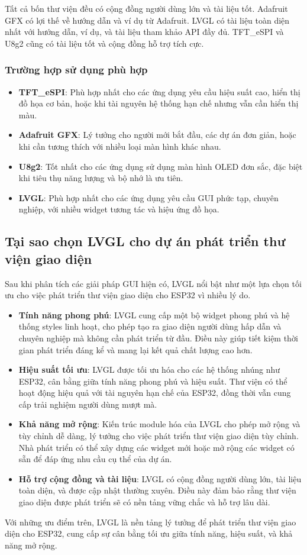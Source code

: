 Tất cả bốn thư viện đều có cộng đồng người dùng lớn và tài liệu tốt. Adafruit GFX có lợi thế về hướng dẫn và ví dụ từ Adafruit. LVGL có tài liệu toàn diện nhất với hướng dẫn, ví dụ, và tài liệu tham khảo API đầy đủ. TFT\_eSPI và U8g2 cũng có tài liệu tốt và cộng đồng hỗ trợ tích cực.

\subsubsection{Trường hợp sử dụng phù hợp}
\begin{itemize}
    \item \textbf{TFT\_eSPI}: Phù hợp nhất cho các ứng dụng yêu cầu hiệu suất cao, hiển thị đồ họa cơ bản, hoặc khi tài nguyên hệ thống hạn chế nhưng vẫn cần hiển thị màu.
    \item \textbf{Adafruit GFX}: Lý tưởng cho người mới bắt đầu, các dự án đơn giản, hoặc khi cần tương thích với nhiều loại màn hình khác nhau.
    \item \textbf{U8g2}: Tốt nhất cho các ứng dụng sử dụng màn hình OLED đơn sắc, đặc biệt khi tiêu thụ năng lượng và bộ nhớ là ưu tiên.
    \item \textbf{LVGL}: Phù hợp nhất cho các ứng dụng yêu cầu GUI phức tạp, chuyên nghiệp, với nhiều widget tương tác và hiệu ứng đồ họa.
\end{itemize}
\subsection{Tại sao chọn LVGL cho dự án phát triển thư viện giao diện}
Sau khi phân tích các giải pháp GUI hiện có, LVGL nổi bật như một lựa chọn tối ưu cho việc phát triển thư viện giao diện cho ESP32 vì nhiều lý do.
\begin{itemize}
    \item \textbf{Tính năng phong phú}: LVGL cung cấp một bộ widget phong phú và hệ thống styles linh hoạt, cho phép tạo ra giao diện người dùng hấp dẫn và chuyên nghiệp mà không cần phát triển từ đầu. Điều này giúp tiết kiệm thời gian phát triển đáng kể và mang lại kết quả chất lượng cao hơn.
    \item \textbf{Hiệu suất tối ưu}: LVGL được tối ưu hóa cho các hệ thống nhúng như ESP32, cân bằng giữa tính năng phong phú và hiệu suất. Thư viện có thể hoạt động hiệu quả với tài nguyên hạn chế của ESP32, đồng thời vẫn cung cấp trải nghiệm người dùng mượt mà.
    \item \textbf{Khả năng mở rộng}: Kiến trúc module hóa của LVGL cho phép mở rộng và tùy chỉnh dễ dàng, lý tưởng cho việc phát triển thư viện giao diện tùy chỉnh. Nhà phát triển có thể xây dựng các widget mới hoặc mở rộng các widget có sẵn để đáp ứng nhu cầu cụ thể của dự án.
    \item \textbf{Hỗ trợ cộng đồng và tài liệu}: LVGL có cộng đồng người dùng lớn, tài liệu toàn diện, và được cập nhật thường xuyên. Điều này đảm bảo rằng thư viện giao diện được phát triển sẽ có nền tảng vững chắc và hỗ trợ lâu dài.
\end{itemize}
\tab Với những ưu điểm trên, LVGL là nền tảng lý tưởng để phát triển thư viện giao diện cho ESP32, cung cấp sự cân bằng tối ưu giữa tính năng, hiệu suất, và khả năng mở rộng.